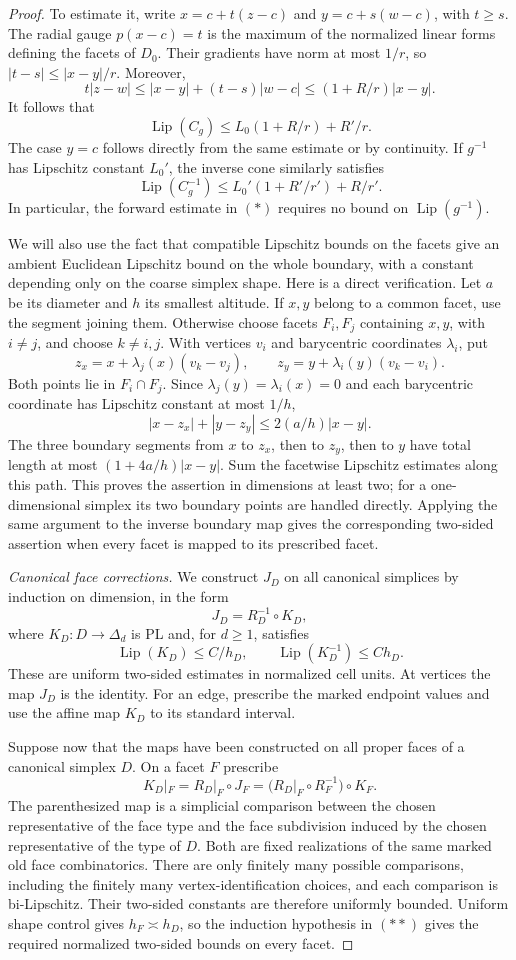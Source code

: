 \documentclass[11pt]{article}
\numberwithin{equation}{section}
\theoremstyle{definition}
\theoremstyle{remark}
\DeclareMathOperator{\Lip}{Lip}
\begin{document}
\begin{proof}
To estimate it, write
$x=c+t(z-c)$ and $y=c+s(w-c)$, with $t\geq s$.
The radial gauge $p(x-c)=t$ is the maximum of the normalized
linear forms defining the facets of $D_0$.  Their gradients have
norm at most $1/r$, so $|t-s|\leq |x-y|/r$.  Moreover,
\[
 t|z-w|\leq |x-y|+(t-s)|w-c|
 \leq (1+R/r)|x-y|.
\]
It follows that
\[
 \Lip(C_g)\leq L_0(1+R/r)+R'/r.                 \tag{*}
\]
The case $y=c$ follows directly from the same estimate or by
continuity.  If $g^{-1}$ has Lipschitz constant $L_0'$, the inverse
cone similarly satisfies
\[
 \Lip(C_g^{-1})\leq L_0'(1+R'/r')+R/r'.
\]
In particular, the forward estimate in $(*)$ requires no bound on
$\Lip(g^{-1})$.

We will also use the fact that compatible Lipschitz bounds on the
facets give an ambient Euclidean Lipschitz bound on the whole
boundary, with a constant depending only on the coarse simplex
shape.  Here is a direct verification.  Let $a$ be its diameter and
$h$ its smallest altitude.  If $x,y$ belong to a common facet,
use the segment joining them.  Otherwise choose facets $F_i,F_j$
containing $x,y$, with $i\ne j$, and choose $k\ne i,j$.
With vertices $v_i$ and barycentric coordinates $\lambda_i$, put
\[
 z_x=x+\lambda_j(x)(v_k-v_j),\qquad
 z_y=y+\lambda_i(y)(v_k-v_i).
\]
Both points lie in $F_i\cap F_j$.  Since
$\lambda_j(y)=\lambda_i(x)=0$ and each barycentric coordinate has
Lipschitz constant at most $1/h$,
\[
 |x-z_x|+|y-z_y|\leq 2(a/h)|x-y|.
\]
The three boundary segments from $x$ to $z_x$, then to $z_y$,
then to $y$ have total length at most
$(1+4a/h)|x-y|$.  Sum the facetwise Lipschitz estimates along this
path.  This proves the assertion in dimensions at least two;
for a one-dimensional simplex its two boundary points are handled
directly.  Applying the same argument to the inverse boundary map
gives the corresponding two-sided assertion when every facet is
mapped to its prescribed facet.

\emph{Canonical face corrections.}
We construct $J_D$ on all canonical simplices by induction on
dimension, in the form
\[
 J_D=R_D^{-1}\circ K_D,
\]
where $K_D:D\to\Delta_d$ is PL and, for $d\geq 1$, satisfies
\[
 \Lip(K_D)\leq C/h_D,
 \qquad \Lip(K_D^{-1})\leq C h_D.
\]
These are uniform two-sided estimates in normalized cell units.
At vertices the map $J_D$ is the identity.  For an edge, prescribe
the marked endpoint values and use the affine map $K_D$ to its
standard interval.

Suppose now that the maps have been constructed on all proper
faces of a canonical simplex $D$.  On a facet $F$ prescribe
\[
 K_D|_F
   =R_D|_F\circ J_F
   =\bigl(R_D|_F\circ R_F^{-1}\bigr)\circ K_F.       \tag{**}
\]
The parenthesized map is a simplicial comparison between the
chosen representative of the face type and the face subdivision
induced by the chosen representative of the type of $D$.
Both are fixed realizations of the same marked old face
combinatorics.  There are only finitely many possible comparisons,
including the finitely many vertex-identification choices, and
each comparison is bi-Lipschitz.  Their two-sided constants are
therefore uniformly bounded.  Uniform shape control gives
$h_F\asymp h_D$, so the induction hypothesis in $(**)$ gives the
required normalized two-sided bounds on every facet.


\end{proof}
\end{document}
